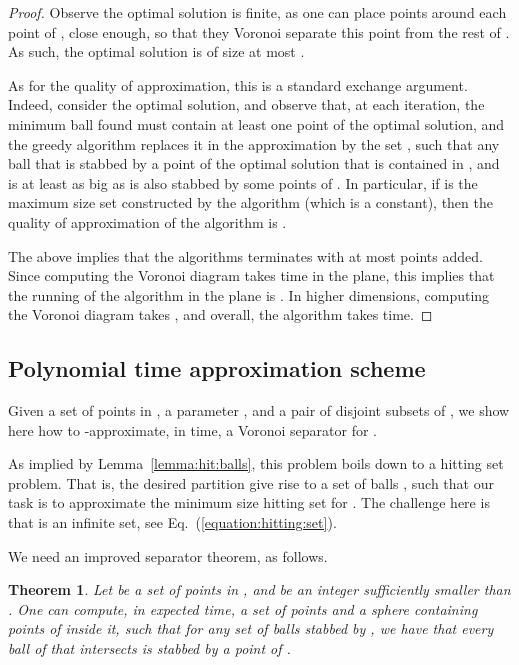 \InSubmitVer{\documentclass[11pt]{article}}
\numberwithin{figure}{section}
\numberwithin{table}{section}
\numberwithin{equation}{section}
\newtheorem{theorem}{Theorem}[section] \newtheorem{lemma}[theorem]{Lemma}
\newcommand{\Eqrefpage}[1]{Eq.~(\ref{equation:#1})}
\newcommand{\lemref}[1]{Lemma~\ref{lemma:#1}}
\newcommand{\seclab}[1]{\label{section:#1}}
\newcommand{\thmlab}[1]{\label{theorem:#1}}
\begin{document}
\begin{proof}
    Observe the optimal solution is finite, as one can place 
    points around each point of , close enough, so that
    they Voronoi separate this point from the rest of . As
    such, the optimal solution is of size at most
    .
    
    As for the quality of approximation, this is a standard exchange
    argument. Indeed, consider the optimal solution, and observe that,
    at each iteration, the minimum ball found  must contain at
    least one point of the optimal solution, and the greedy algorithm
    replaces it in the approximation by the set , such
    that any ball that is stabbed by a point of the optimal solution
    that is contained in , and is at least as big as 
    is also stabbed by some points of . In particular,
    if  is the maximum size set  constructed by the
    algorithm (which is a constant), then the quality of approximation
    of the algorithm is .
    
    The above implies that the algorithms terminates with at most
     points added. Since computing the Voronoi diagram takes
     time in the plane, this implies that the running of
    the algorithm in the plane is .  In higher
    dimensions, computing the Voronoi diagram takes
    , and overall, the algorithm takes
     time.
\end{proof}






\subsection{Polynomial time approximation scheme}
\seclab{PTAS}

Given a set  of  points in , a parameter ,
and a pair of disjoint subsets  of ,
we show here how to -approximate, in 
time, a Voronoi separator  for .

As implied by \lemref{hit:balls}, this problem boils down to a hitting
set problem. That is, the desired partition give rise to a set of
balls , such that our task is to approximate the minimum
size hitting set for . The challenge here is that
 is an infinite set, see \Eqrefpage{hitting:set}.


We need an improved separator theorem, as follows.
\begin{theorem}
    \thmlab{ball:separator}Let  be a set of points in , and  be an integer
    sufficiently smaller than .  One can compute, in
     expected time, a set  of
     points and a sphere  containing
     points of  inside it, such that for any set
     of balls stabbed by , we have that every ball
    of  that intersects  is stabbed by a point of
    .
\end{theorem}
\end{document}
